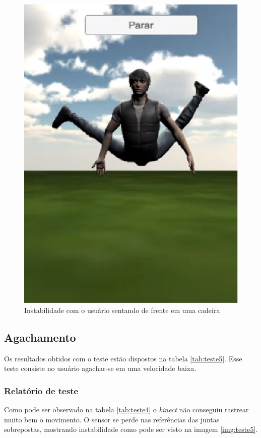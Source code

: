 \begin{figure}[H]
\centering
\includegraphics [keepaspectratio=true,scale=0.60]{figuras/cadeiraFrente.eps}
\caption{Instabilidade com o usuário sentando de frente em uma cadeira}
\label{img:teste4}
\end{figure}

\subsection{Agachamento}\label{sub:teste5}
Os resultados obtidos com o teste estão dispostos na tabela \ref{tab:teste5}. Esse teste consiste no usuário agachar-se em uma velocidade
baixa.

\subsubsection{Relatório de teste}\label{sub:relteste2}
Como pode ser observado na tabela \ref{tab:teste4} o \textit{kinect} não conseguiu rastrear muito bem o movimento. O sensor se perde nas referências das juntas
sobrepostas, mostrando instabilidade como pode ser visto na imagem \ref{img:teste5}.

